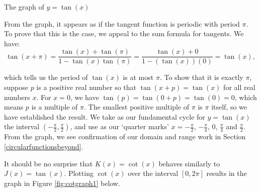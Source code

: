 \bigskip

\noindent\begin{minipage}{\textwidth}
\begin{center}
\end{center}
\captionsetup{type=figure}
\caption{The graph of $y = \tan(x)$}\label{fig:tangraph2}
\end{minipage}

\medskip

From the graph, it appears as if the tangent function is periodic with period $\pi$.  To prove that this is the case, we appeal to the sum formula for tangents.  We have: \[ \tan(x+\pi) = \dfrac{\tan(x) + \tan(\pi)}{1 - \tan(x) \tan(\pi)} = \dfrac{\tan(x) + 0}{1 - (\tan(x) )(0)} = \tan(x),\]

which tells us the period of $\tan(x)$ is at most $\pi$.  To show that it is exactly $\pi$, suppose $p$ is a positive real number so that $\tan(x+p) = \tan(x)$ for all real numbers $x$.  For $x=0$, we have $\tan(p) = \tan(0+p) = \tan(0) = 0$, which means $p$ is a multiple of $\pi$.  The smallest positive multiple of $\pi$ is $\pi$ itself, so we have established the result.   We take as our fundamental cycle for $y=\tan(x)$ the interval $\left(-\frac{\pi}{2}, \frac{\pi}{2}\right)$, and use as our `quarter marks' $x = -\frac{\pi}{2}$, $-\frac{\pi}{4}$, $0$, $\frac{\pi}{4}$ and $\frac{\pi}{2}$. From the graph, we see confirmation of our domain and range work  in Section \ref{circularfunctionsbeyond}. 

\smallskip

It should be no surprise that $K(x) = \cot(x)$ behaves similarly to $J(x) = \tan(x)$. Plotting $\cot(x)$ over the interval $[0,2\pi]$ results in the graph in Figure \ref{fig:cotgraph1} below. 


\medskip

